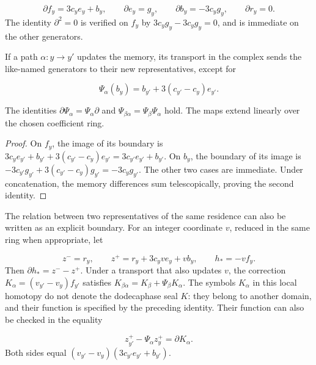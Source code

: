 \[
\partial f_y=3c_y e_y+b_y,\qquad
\partial e_y=g_y,\qquad
\partial b_y=-3c_y g_y,\qquad
\partial r_y=0.
\]
The identity \(\partial^2=0\) is verified on \(f_y\) by \(3c_yg_y-3c_yg_y=0\), and is immediate on the other generators.

If a path \(\alpha:y\to y'\) updates the memory, its transport in the complex sends the like-named generators to their new representatives, except for

\[
\Psi_\alpha(b_y)=b_{y'}+3(c_{y'}-c_y)e_{y'}.
\]
\begin{proposition}
\label{act21:prop:continuo-naturalidad-memoria}
The identities \(\partial\Psi_\alpha=\Psi_\alpha\partial\) and \(\Psi_{\beta\alpha}=\Psi_\beta\Psi_\alpha\) hold. The maps extend linearly over the chosen coefficient ring.
\end{proposition}
\begin{proof}
On \(f_y\), the image of its boundary is \(3c_ye_{y'}+b_{y'}+3(c_{y'}-c_y)e_{y'} =3c_{y'}e_{y'}+b_{y'}\). On \(b_y\), the boundary of its image is \(-3c_{y'}g_{y'}+3(c_{y'}-c_y)g_{y'}=-3c_yg_{y'}\). The other two cases are immediate. Under concatenation, the memory differences sum telescopically, proving the second identity.
\end{proof}

The relation between two representatives of the same residence can also be written as an explicit boundary. For an integer coordinate \(v\), reduced in the same ring when appropriate, let

\[
z^-=r_y,\qquad z^+=r_y+3c_yv e_y+v b_y,
\qquad h_*=-vf_y.
\]
Then \(\partial h_*=z^--z^+\). Under a transport that also updates \(v\), the correction \(K_\alpha=(v_{y'}-v_y)f_{y'}\) satisfies \(K_{\beta\alpha}=K_\beta+\Psi_\beta K_\alpha\). The symbols \(K_\alpha\) in this local homotopy do not denote the dodecaphase seal \(K\): they belong to another domain, and their function is specified by the preceding identity. Their function can also be checked in the equality

\[
z^+_{y'}-\Psi_\alpha z^+_y=\partial K_\alpha.
\]
Both sides equal \((v_{y'}-v_y)(3c_{y'}e_{y'}+b_{y'})\).

